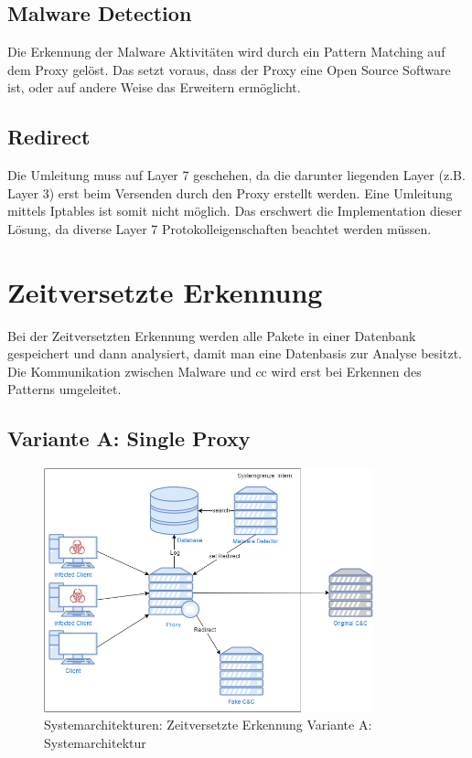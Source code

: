 \subsection{Malware Detection}
Die Erkennung der Malware Aktivitäten wird durch ein Pattern Matching auf dem Proxy gelöst. Das setzt voraus, dass der Proxy eine Open Source Software ist, oder auf andere Weise das Erweitern ermöglicht.

\subsection{Redirect}
Die Umleitung muss auf Layer 7 geschehen, da die darunter liegenden Layer (z.B. Layer 3) erst beim Versenden durch den Proxy erstellt werden. Eine Umleitung mittels Iptables ist somit nicht möglich. Das erschwert die Implementation dieser Lösung, da diverse Layer 7 Protokolleigenschaften beachtet werden müssen.


\section{Zeitversetzte Erkennung}
Bei der Zeitversetzten Erkennung werden alle Pakete in einer Datenbank gespeichert und dann analysiert, damit man eine Datenbasis zur Analyse besitzt.
Die Kommunikation zwischen Malware und \gls{cc} wird erst bei Erkennen des Patterns umgeleitet.


\subsection{Variante A: Single Proxy}

\begin{figure}[H]
	\centering
	\includegraphics[width=0.85\textwidth]{img/Architektur-ZE-A.png}
	\caption{Systemarchitekturen: Zeitversetzte Erkennung Variante A: Systemarchitektur}
	\label{fig:Zeitversetzte Erkennung Variante A: Systemarchitektur}
\end{figure}

